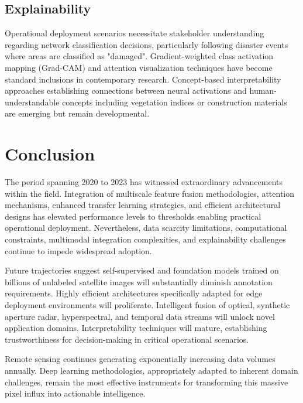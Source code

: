 \documentclass[12pt,a4paper]{article}
\begin{document}
\subsection{Explainability}
Operational deployment scenarios necessitate stakeholder understanding regarding network classification decisions, particularly following disaster events where areas are classified as "damaged". Gradient-weighted class activation mapping (Grad-CAM) and attention visualization techniques have become standard inclusions in contemporary research. Concept-based interpretability approaches establishing connections between neural activations and human-understandable concepts including vegetation indices or construction materials are emerging but remain developmental.

\section{Conclusion}
\label{sec:conclusion}
The period spanning 2020 to 2023 has witnessed extraordinary advancements within the field. Integration of multiscale feature fusion methodologies, attention mechanisms, enhanced transfer learning strategies, and efficient architectural designs has elevated performance levels to thresholds enabling practical operational deployment. Nevertheless, data scarcity limitations, computational constraints, multimodal integration complexities, and explainability challenges continue to impede widespread adoption.

Future trajectories suggest self-supervised and foundation models trained on billions of unlabeled satellite images will substantially diminish annotation requirements. Highly efficient architectures specifically adapted for edge deployment environments will proliferate. Intelligent fusion of optical, synthetic aperture radar, hyperspectral, and temporal data streams will unlock novel application domains. Interpretability techniques will mature, establishing trustworthiness for decision-making in critical operational scenarios.

Remote sensing continues generating exponentially increasing data volumes annually. Deep learning methodologies, appropriately adapted to inherent domain challenges, remain the most effective instruments for transforming this massive pixel influx into actionable intelligence.
\end{document}
